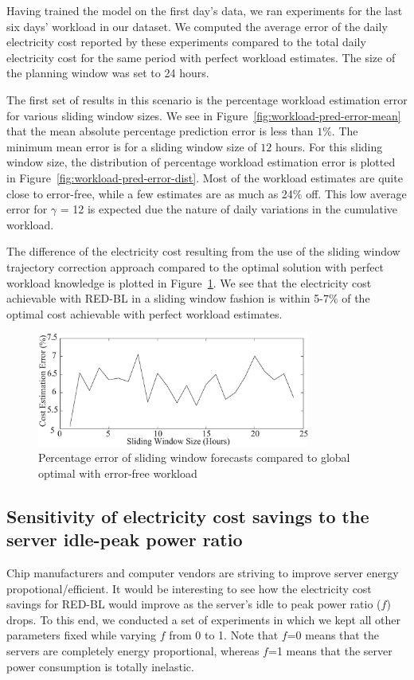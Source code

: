 Having trained the model on the first day's data, we ran experiments for the last six days' workload in our dataset. We computed the average error of the daily electricity cost reported by these experiments compared to the total daily electricity cost for the same period with perfect workload estimates. The size of the planning window was set to 24 hours. 

The first set of results in this scenario is the percentage workload estimation error for various sliding window sizes. We see in Figure~\ref{fig:workload-pred-error-mean} that the mean absolute percentage prediction error is less than $1\%$. The minimum mean error is for a sliding window size of $12$ hours. For this sliding window size, the distribution of percentage workload estimation error is plotted in Figure~\ref{fig:workload-pred-error-dist}. Most of the workload estimates are quite close to error-free, while a few estimates are as much as 24$\%$ off. This low average error for $\gamma$ = 12 is expected due the nature of daily variations in the cumulative workload.

The difference of the electricity cost resulting from the use of the sliding window trajectory correction approach compared to the optimal solution with perfect workload knowledge is plotted in Figure~\ref{fig:s5r}. We see that the electricity cost achievable with RED-BL in a sliding window fashion is within 5-7$\%$ of the optimal cost achievable with perfect workload estimates. 

\begin{figure}[htbp]
    \centering
    \includegraphics[width=0.8\textwidth]{pics/sw-cost-error-2.eps}
\caption{Percentage error of sliding window forecasts compared to global optimal with error-free workload}
\label{fig:s5r}
\end{figure}



\subsection{Sensitivity of electricity cost savings to the server idle-peak power ratio}
Chip manufacturers and computer vendors are striving to improve server energy propotional/efficient. It would be interesting to see how the electricity cost savings for RED-BL would improve as the server's idle to peak power ratio ($f$) drops. To this end, we conducted a set of experiments in which we kept all other parameters fixed while varying $f$ from 0 to 1.  Note that $f$=0 means that the servers are completely energy proportional, whereas $f$=1 means that the server power consumption is totally inelastic.


